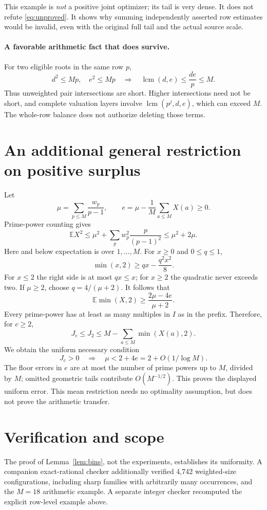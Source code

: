 \documentclass[a4paper,11pt]{article}
\theoremstyle{remark}\newtheorem{remark}[theorem]{Remark}
\begin{document}
This example is \emph{not} a positive joint optimizer; its tail is very dense. It does not refute \eqref{eq:unproved}. It shows why summing independently asserted row estimates would be invalid, even with the original full tail and the actual source scale.

\paragraph{A favorable arithmetic fact that does survive.}
For two eligible roots in the same row $p$,
\[
 d^2\le Mp,\quad e^2\le Mp
 \quad\Longrightarrow\quad
 \operatorname{lcm}(d,e)\le\frac{de}{p}\le M.
\]
Thus unweighted pair intersections are short. Higher intersections need not be short, and complete valuation layers involve $\operatorname{lcm}(p^j,d,e)$, which can exceed $M$. The whole-row balance does not authorize deleting those terms.

\section{An additional general restriction on positive surplus}
Let
\[
 \mu=\sum_{p\le M}\frac{w_p}{p-1},\qquad
 e=\mu-\frac1M\sum_{a\le M}X(a)\ge0.
\]
Prime-power counting gives
\[
 \mathbb E X^2\le\mu^2+\sum_p w_p^2\frac{p}{(p-1)^2}
 \le\mu^2+2\mu.
\]
Here and below expectation is over $1,\ldots,M$. For $x\ge0$ and $0\le q\le1$,
\[
 \min(x,2)\ge qx-\frac{q^2x^2}{8}.
\]
For $x\le2$ the right side is at most $qx\le x$; for $x\ge2$ the quadratic never exceeds two. If $\mu\ge2$, choose $q=4/(\mu+2)$. It follows that
\[
 \mathbb E\min(X,2)\ge\frac{2\mu-4e}{\mu+2}.
\]
Every prime-power has at least as many multiples in $I$ as in the prefix. Therefore, for $c\ge2$,
\[
 J_c\le J_2\le M-\sum_{a\le M}\min(X(a),2).
\]
We obtain the uniform necessary condition
\begin{equation}\label{eq:mean}
 \boxed{J_c>0\quad\Longrightarrow\quad\mu<2+4e
        =2+O(1/\log M).}
\end{equation}
The floor errors in $e$ are at most the number of prime powers up to $M$, divided by $M$; omitted geometric tails contribute $O(M^{-1/2})$. This proves the displayed uniform error. This mean restriction needs no optimality assumption, but does not prove the arithmetic transfer.

\section{Verification and scope}
The proof of Lemma~\ref{lem:bins}, not the experiments, establishes its uniformity. A companion exact-rational checker additionally verified 4,742 weighted-size configurations, including sharp families with arbitrarily many occurrences, and the $M=18$ arithmetic example. A separate integer checker recomputed the explicit row-level example above.
\end{document}
